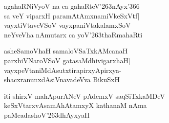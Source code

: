 \documentclass[twoside,12pt,openright]{book}
\def\S{\char'263}
\newcounter{shloka}[chapter]
\begin{document}
\begin{shloka}%
agahaRNiVyoV na ca gahaRteV\S nAyx\char'366\\
sa veY viparxH paramAtAmxnamiVkeSxVtf|\\
vayxtiVtaveVSoV vayxpaniVtakalamxSoV\\
neYveVha nAmutarx ca yoV\S thaRmahaRti
\end{shloka}

\begin{shloka}%
asheSamoVhaH samaloVSaTxkAMcanaH\\
parxhiVNaroVSoV gatasaMdhivigarxhaH|\\
vayxpeVtaniMdAsutxtirapirxyApirxya-\\
shacxranunxdAsiVnavadeVva BikuSxH
\end{shloka}

\begin{center}
iti shirxV mahApurANeV pAdemxV saqSiTxkaMDeV\\
keSxVtarxvAsamAhAtamxyX kathanaM nAma\\
paMcadashoV\S dhAyxyaH
\end{center}
\end{document}
